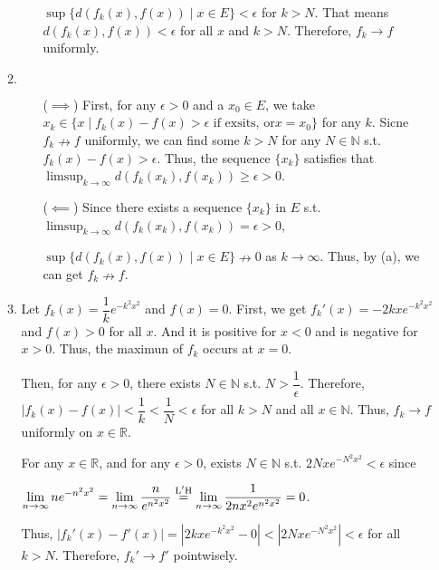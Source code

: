 \documentclass[12pt]{article}
\begin{document}
\begin{enumerate}
\begin{enumerate}
\begin{enumerate}
            $\sup \{ d(f_k(x), f(x)) \mid x \in E\} < \epsilon$ for $k > N$.
            That means $d(f_k(x), f(x)) < \epsilon$ for all $x$ and $k > N$.
            Therefore, $f_k \to f$ uniformly.
        \end{enumerate}
        \newpage

        \item $\ $\begin{enumerate}
            \item[($\implies$)] First, for any $\epsilon > 0$ and a $x_0 \in E$, we take $x_k \in \{ x \mid f_k(x) - f(x) > \epsilon\text{ if exsits, or} x = x_0\}$ for any $k$.
            Sicne $f_k \nrightarrow f$ uniformly, we can find some $k > N$ for any $N\in \mathbb{N}$ s.t. $f_k(x) - f(x) > \epsilon$.
            Thus, the sequence $\{ x_k\}$ satisfies that $\displaystyle\limsup_{k\to\infty} d(f_k(x_k), f(x_k)) \geq \epsilon > 0$.

            \item[($\impliedby$)] Since there exists a sequence $\{ x_k \}$ in $E$ s.t. $\displaystyle\limsup_{k\to\infty} d(f_k(x_k), f(x_k)) = \epsilon > 0$,

            $\sup \{ d(f_k(x), f(x)) \mid x\in E\} \nrightarrow 0$ as $k \to \infty$.
            Thus, by (a), we can get $f_k \nrightarrow f$.
        \end{enumerate}

        \item Let $f_k(x) = \dfrac{1}{k}e^{-k^2x^2}$ and $f(x) = 0$.
        First, we get $f_k'(x) = -2kxe^{-k^2x^2}$ and $f(x) > 0$ for all $x$.
        And it is positive for $x < 0$ and is negative for $x > 0$.
        Thus, the maximun of $f_k$ occurs at $x = 0$.
        
        Then, for any $\epsilon > 0$, there exists $N \in \mathbb{N}$ s.t. $N > \dfrac{1}{\epsilon}$.
        Therefore, $|f_k(x) - f(x)| < \dfrac{1}{k} < \dfrac{1}{N} < \epsilon$ for all $k > N$ and all $x\in \mathbb{N}$.
        Thus, $f_k \to f$ uniformly on $x \in \mathbb{R}$.

        For any $x \in \mathbb{R}$, and for any $\epsilon > 0$, exists $N \in \mathbb{N}$
        s.t. $2Nxe^{-N^2x^2} < \epsilon$ since 
        
        $\displaystyle\lim_{n\to\infty} ne^{-n^2x^2} = \displaystyle\lim_{n\to\infty} \dfrac{n}{e^{n^2x^2}} \overset{\rm L'H}{=} \displaystyle\lim_{n\to\infty} \dfrac{1}{2nx^2e^{n^2x^2}} = 0$.

        Thus, $|f_k'(x) - f'(x)| = |2kxe^{-k^2x^2} - 0| < |2Nxe^{-N^2x^2}| < \epsilon$ for all $k > N$.
        Therefore, $f_k' \to f'$ pointwisely.


\end{enumerate}
\end{enumerate}
\end{document}

